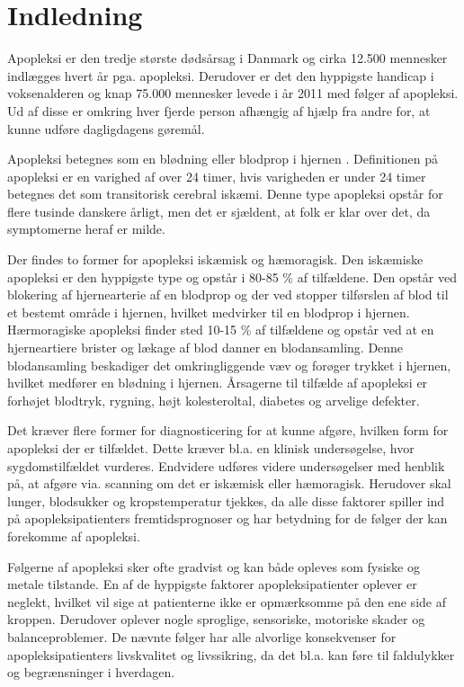 \section{Indledning}
Apopleksi er den tredje største dødsårsag i Danmark og cirka 12.500 mennesker indlægges hvert år pga. apopleksi. Derudover er det den hyppigste handicap i voksenalderen og knap 75.000 mennesker levede i år 2011 med følger af apopleksi. Ud af disse er omkring hver fjerde person afhængig af hjælp fra andre for, at kunne udføre dagligdagens gøremål. \cite{Hjernesagen2015a}

Apopleksi betegnes som en blødning eller blodprop i hjernen \cite{Hjernesagen2015a}. Definitionen på apopleksi er en varighed af over 24 timer, hvis varigheden er under 24 timer betegnes det som transitorisk cerebral iskæmi\cite{Sundhed.dk2014, Ritter2015}. Denne type apopleksi opstår for flere tusinde danskere årligt, men det er sjældent, at folk er klar over det, da symptomerne heraf er milde\cite{Hjernesagen2015a}.

Der findes to former for apopleksi iskæmisk og hæmoragisk.
Den iskæmiske apopleksi er den hyppigste type og opstår i 80-85 \% af tilfældene\cite{Sundhed.dk2014}. Den opstår ved blokering af hjernearterie af en blodprop og der ved stopper tilførslen af blod til et bestemt område i hjernen, hvilket medvirker til en blodprop i hjernen\cite{Hjernesagen2015a}.
Hærmoragiske apopleksi finder sted 10-15 \% af tilfældene og opstår ved at en hjerneartiere brister og lækage af blod danner en blodansamling\cite{Sundhed.dk2014, Schulze2011}. Denne blodansamling beskadiger det omkringliggende væv og forøger trykket i hjernen, hvilket medfører en blødning i hjernen\citep{Caplan2006}. Årsagerne til tilfælde af apopleksi er forhøjet blodtryk, rygning, højt kolesteroltal, diabetes og arvelige defekter\cite{Academic2015}.

Det kræver flere former for diagnosticering for at kunne afgøre, hvilken form for apopleksi der er tilfældet. Dette kræver bl.a. en klinisk undersøgelse, hvor sygdomstilfældet vurderes.\citep{Sundhedsstyrelsen2009} Endvidere udføres videre undersøgelser med henblik på, at afgøre via. scanning om det er iskæmisk eller hæmoragisk. Herudover skal lunger, blodsukker og kropstemperatur tjekkes, da alle disse faktorer spiller ind på apopleksipatienters fremtidsprognoser og har betydning for de følger der kan forekomme af apopleksi.\citep{Sundhedsstyrelsen2009}

Følgerne af apopleksi sker ofte gradvist og kan både opleves som fysiske og metale tilstande\cite{Muus2008}. En af de hyppigste faktorer apopleksipatienter oplever er neglekt, hvilket vil sige at patienterne ikke er opmærksomme på den ene side af kroppen\cite{Sundhed.dk}. Derudover oplever nogle sproglige, sensoriske, motoriske skader og balanceproblemer\cite{Nichols1997, Muus2008}. De nævnte følger har alle alvorlige konsekvenser for apopleksipatienters livskvalitet og livssikring, da det bl.a. kan føre til faldulykker og begrænsninger i hverdagen. 

